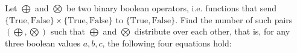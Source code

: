Let $\bigoplus$ and $\bigotimes$ be two binary boolean operators, i.e. functions that send $\{\text{True}, \text{False}\}\times \{\text{True}, \text{False}\}$ to $\{\text{True}, \text{False}\}$. Find the number of such pairs $(\bigoplus, \bigotimes)$ such that $\bigoplus$ and $\bigotimes$ distribute over each other, that is, for any three boolean values $a, b, c$, the following four equations hold:

\begin{enumerate}
\end{enumerate}
